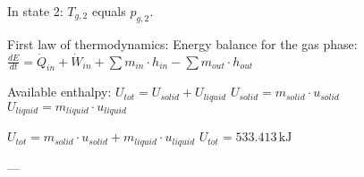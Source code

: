 In state 2:  
\( T_{g,2} \) equals \( p_{g,2} \).  

First law of thermodynamics:  
Energy balance for the gas phase:  
\( \frac{dE}{dt} = \dot{Q}_{in} + \dot{W}_{in} + \sum m_{in} \cdot h_{in} - \sum m_{out} \cdot h_{out} \)  

Available enthalpy:  
\( U_{tot} = U_{solid} + U_{liquid} \)  
\( U_{solid} = m_{solid} \cdot u_{solid} \)  
\( U_{liquid} = m_{liquid} \cdot u_{liquid} \)  

\( U_{tot} = m_{solid} \cdot u_{solid} + m_{liquid} \cdot u_{liquid} \)  
\( U_{tot} = 533.413 \, \text{kJ} \)  

---